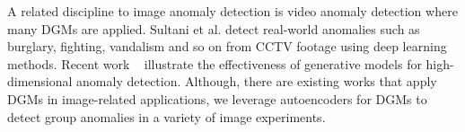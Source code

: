 A  related discipline to image anomaly detection is video anomaly detection where many DGMs are applied.  
 Sultani  et al.  \cite{survideos1} detect real-world anomalies such as burglary, fighting, vandalism and so on from  CCTV footage using deep learning methods.  %
Recent work ~\cite{schlegl2017unsupervised,xu2018unsupervised,an2015variational} illustrate the effectiveness of generative models for high-dimensional anomaly detection. Although, there are existing works that apply DGMs in image-related applications, we leverage  autoencoders for DGMs  to detect group anomalies in a variety of image experiments. 
 

